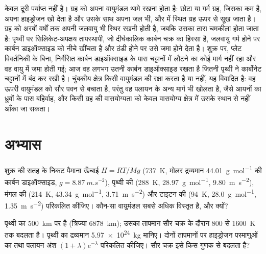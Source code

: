 केवल दूरी पर्याप्त नहीं है। ग्रह को अपना वायुमंडल थामे रखना होता है: छोटा
या गर्म ग्रह, जिसका  कम है, अपना हाइड्रोजन खो देता है और उसके साथ
अपना जल भी, और  में स्थित ग्रह ऊपर से सूख जाता है। ग्रह को
अरबों वर्षों तक अपनी जलवायु भी स्थिर रखनी होती है, जबकि उसका तारा
चमकीला होता जाता है: पृथ्वी पर सिलिकेट-अपक्षय तापस्थापी, जो
दीर्घकालिक कार्बन चक्र का हिस्सा है, जलवायु गर्म होने पर कार्बन डाइऑक्साइड को नीचे खींचता है
और ठंडी होने पर उसे जमा होने देता है। शुक्र पर, प्लेट विवर्तनिकी के बिना,
निर्गैसित कार्बन डाइऑक्साइड के पास चट्टानों में लौटने का कोई मार्ग नहीं रहा और वह
वायु में जमा होती गई; आज वह लगभग उतनी कार्बन डाइऑक्साइड रखता है जितनी
पृथ्वी ने कार्बोनेट चट्टानों में बंद कर रखी है। चुंबकीय क्षेत्र किसी वायुमंडल की रक्षा करता है या नहीं, यह
विवादित है: वह ऊपरी वायुमंडल को सौर पवन से बचाता है, परंतु
वह पलायन के अन्य मार्ग भी खोलता है, जैसे आयनों का
ध्रुवों के पास बहिर्वाह, और किसी ग्रह की वासयोग्यता को
केवल वासयोग्य क्षेत्र में उसके स्थान से नहीं आँका जा सकता।

\section{अभ्यास}

\begin{exercise}[$\star$]\label{exo:b3:planetary-atmospheres:1}
शुक्र की सतह के निकट पैमाना ऊँचाई $H = RT/Mg$
(\qty{737}{K}, मोलर द्रव्यमान \qty{44.01}{g.mol^{-1}} की कार्बन डाइऑक्साइड,
$g = \qty{8.87}{m.s^{-2}}$), पृथ्वी की (\qty{288}{K},
\qty{28.97}{g.mol^{-1}}, \qty{9.80}{m.s^{-2}}), मंगल की (\qty{214}{K},
\qty{43.34}{g.mol^{-1}}, \qty{3.71}{m.s^{-2}}) और टाइटन की (\qty{94}{K},
\qty{28.0}{g.mol^{-1}}, \qty{1.35}{m.s^{-2}}) परिकलित कीजिए।
कौन-सा वायुमंडल सबसे अधिक विस्तृत है, और क्यों?
\end{exercise}

\begin{exercise}[$\star$]\label{exo:b3:planetary-atmospheres:2}
पृथ्वी का  \qty{500}{km} पर है (त्रिज्या \qty{6878}{km}); उसका
तापमान सौर चक्र के दौरान 800 से \qty{1600}{K} तक बदलता है। पृथ्वी का द्रव्यमान
\qty{5.97e24}{kg} मानिए। दोनों तापमानों पर हाइड्रोजन परमाणुओं का 
तथा पलायन अंश
$(1 + \lambda)e^{-\lambda}$ परिकलित कीजिए। सौर चक्र इसे किस गुणक से बदलता है?
\end{exercise}

